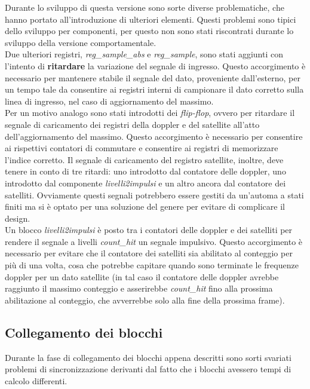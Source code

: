 \documentclass[12pt,a4paper,twoside,openany]{book}
\begin{document}
Durante lo sviluppo di questa versione sono sorte diverse problematiche, che hanno portato all'introduzione di ulteriori elementi. Questi problemi sono tipici dello sviluppo per componenti, per questo non sono stati riscontrati durante lo sviluppo della versione comportamentale. \\
Due ulteriori registri, \textit{reg\_sample\_abs} e \textit{reg\_sample}, sono stati aggiunti con l'intento di \textbf{ritardare} la variazione del segnale di ingresso. Questo accorgimento è necessario per mantenere stabile il segnale del dato, proveniente dall'esterno, per un tempo tale da consentire ai registri interni di campionare il dato corretto sulla linea di ingresso, nel caso di aggiornamento del massimo.\\
Per un motivo analogo sono stati introdotti dei \textit{flip-flop}, ovvero per ritardare il segnale di caricamento dei registri della doppler e del satellite all'atto dell'aggiornamento del massimo. Questo accorgimento è necessario per consentire ai rispettivi contatori di commutare e consentire ai registri di memorizzare l'indice corretto. Il segnale di caricamento del registro satellite, inoltre, deve tenere in conto di tre ritardi: uno introdotto dal contatore delle doppler, uno introdotto dal componente \textit{livelli2impulsi} e un altro ancora dal contatore dei satelliti. Ovviamente questi segnali potrebbero essere gestiti da un'automa a stati finiti ma si è optato per una soluzione del genere per evitare di complicare il design.\\
Un blocco \textit{livelli2impulsi} è posto tra i contatori delle doppler e dei satelliti per rendere il segnale a livelli \textit{count\_hit} un segnale impulsivo. Questo accorgimento è necessario per evitare che il contatore dei satelliti sia abilitato al conteggio per più di una volta, cosa che potrebbe capitare quando sono terminate le frequenze doppler per un dato satellite (in tal caso il contatore delle doppler avrebbe raggiunto il massimo conteggio e asserirebbe \textit{count\_hit} fino alla prossima abilitazione al conteggio, che avverrebbe solo alla fine della prossima frame).\\
\clearpage
\subsection{Collegamento dei blocchi}
Durante la fase di collegamento dei blocchi appena descritti sono sorti svariati problemi di sincronizzazione derivanti dal fatto che i blocchi avessero tempi di calcolo differenti. 
\end{document}
